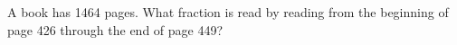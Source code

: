 A book has 1464 pages. What fraction is read by reading from the beginning of page 426 through the end of page 449?
